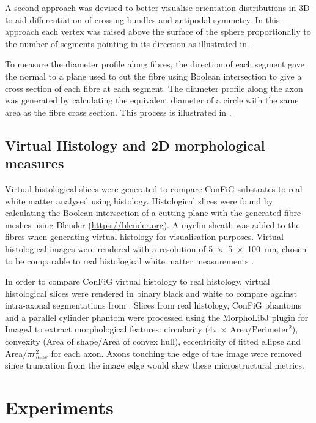 A second approach was devised to better visualise orientation distributions in 3D to aid differentiation of crossing bundles and antipodal symmetry. In this approach each vertex was raised above the surface of the sphere proportionally to the number of segments pointing in its direction as illustrated in .

To measure the diameter profile along fibres, the direction of each segment gave the normal to a plane used to cut the fibre using Boolean intersection to give a cross section of each fibre at each segment. The diameter profile along the axon was generated by calculating the equivalent diameter of a circle with the same area as the fibre cross section. This process is illustrated in .

\subsection{Virtual Histology and 2D morphological measures}
\label{sec:confg_virtual_histology}
Virtual histological slices were generated to compare ConFiG substrates to real white matter analysed using histology. Histological slices were found by calculating the Boolean intersection of a cutting plane with the generated fibre meshes using Blender (\url{https://blender.org}). A myelin sheath was added to the fibres when generating virtual histology for visualisation purposes.  Virtual histological images were rendered with a resolution of \SI{5 x 5 x 100}{\nano\metre}, chosen to be comparable to real histological white matter measurements \cite{Abdollahzadeh2019,Lee2019b}.

In order to compare ConFiG virtual histology to real histology, virtual histological slices were rendered in binary black and white to compare against intra-axonal segmentations from \cite{Lee2019b}. Slices from real histology, ConFiG phantoms and a parallel cylinder phantom were processed using the MorphoLibJ plugin for ImageJ \cite{Rueden2017,Legland2016,Schindelin2012,Schneider2012} to extract morphological features: circularity ($4\pi$ × Area/Perimeter$^2$), convexity (Area of shape/Area of convex hull), eccentricity of fitted ellipse and Area/$\pi r_{max}^2$ for each axon. Axons touching the edge of the image were removed since truncation from the image edge would skew these microstructural metrics.

\section{Experiments}
\label{sec:micro_experiments}

